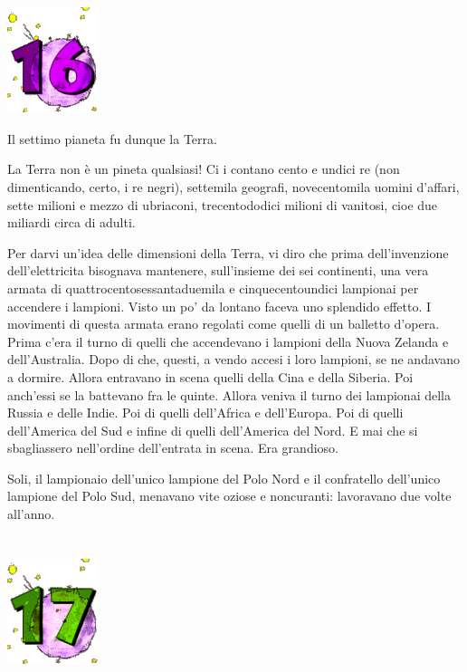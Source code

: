 \documentclass[11pt]{scrbook}
\begin{document}
\chapter{}
\begin{center}
\includegraphics{./img/chapter16.png}
\end{center}

Il settimo pianeta fu dunque la Terra.

La Terra non è un pineta qualsiasi! Ci i contano cento e undici re (non
dimenticando, certo, i re negri), settemila geografi, novecentomila
uomini d'affari, sette milioni e mezzo di ubriaconi, trecentododici
milioni di vanitosi, cioe due miliardi circa di adulti.

Per darvi un'idea delle dimensioni della Terra, vi diro che prima
dell'invenzione dell'elettricita bisognava mantenere, sull'insieme dei
sei continenti, una vera armata di quattrocentosessantaduemila e
cinquecentoundici lampionai per accendere i lampioni. Visto un po' da
lontano faceva uno splendido effetto. I movimenti di questa armata erano
regolati come quelli di un balletto d'opera. Prima c'era il turno di
quelli che accendevano i lampioni della Nuova Zelanda e dell'Australia.
Dopo di che, questi, a vendo accesi i loro lampioni, se ne andavano a
dormire. Allora entravano in scena quelli della Cina e della Siberia.
Poi anch'essi se la battevano fra le quinte. Allora veniva il turno dei
lampionai della Russia e delle Indie. Poi di quelli dell'Africa e
dell'Europa. Poi di quelli dell'America del Sud e infine di quelli
dell'America del Nord. E mai che si sbagliassero nell'ordine
dell'entrata in scena. Era grandioso.

Soli, il lampionaio dell'unico lampione del Polo Nord e il confratello
dell'unico lampione del Polo Sud, menavano vite oziose e noncuranti:
lavoravano due volte all'anno.

\chapter{}
\begin{center}
\includegraphics{./img/chapter17.png}
\end{center}
\end{document}
